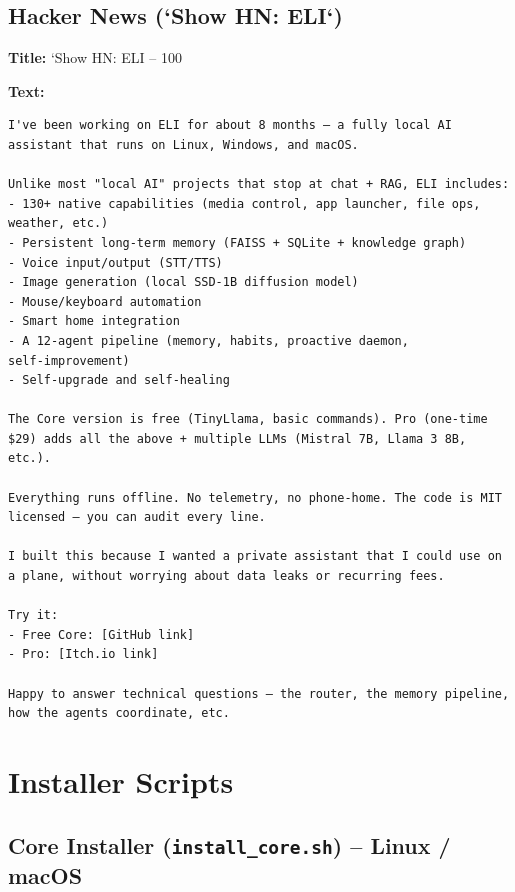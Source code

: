 \documentclass[11pt,a4paper]{article}
\begin{document}
\subsection{Hacker News (`Show HN: ELI`)}

\begin{tcolorbox}[title=Hacker News Post, colback=yellow!5]
\textbf{Title:} `Show HN: ELI – 100%

\textbf{Text:}
\begin{verbatim}
I've been working on ELI for about 8 months – a fully local AI assistant that runs on Linux, Windows, and macOS.

Unlike most "local AI" projects that stop at chat + RAG, ELI includes:
- 130+ native capabilities (media control, app launcher, file ops, weather, etc.)
- Persistent long‑term memory (FAISS + SQLite + knowledge graph)
- Voice input/output (STT/TTS)
- Image generation (local SSD‑1B diffusion model)
- Mouse/keyboard automation
- Smart home integration
- A 12‑agent pipeline (memory, habits, proactive daemon, self‑improvement)
- Self‑upgrade and self‑healing

The Core version is free (TinyLlama, basic commands). Pro (one‑time $29) adds all the above + multiple LLMs (Mistral 7B, Llama 3 8B, etc.).

Everything runs offline. No telemetry, no phone‑home. The code is MIT licensed – you can audit every line.

I built this because I wanted a private assistant that I could use on a plane, without worrying about data leaks or recurring fees.

Try it:
- Free Core: [GitHub link]
- Pro: [Itch.io link]

Happy to answer technical questions – the router, the memory pipeline, how the agents coordinate, etc.
\end{verbatim}
\end{tcolorbox}

\newpage

\section{Installer Scripts}
\label{sec:scripts}

\subsection{Core Installer (\texttt{install\_core.sh}) – Linux / macOS}

\end{document}
